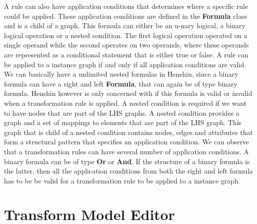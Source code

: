 A rule can also have application conditions that determines where a specific
rule could be applied. These application conditions are defined in the
\textbf{Formula} class and is a child of a graph. This formula can either be an
u-nary logical, a binary logical operation or a nested condition. The first
logical operation operated on a single operand while the second operates on two
operands, where these operands are represented as a conditional statement that
is either true or false. A rule can be applied to a instance graph if and only
if all application conditions are valid. We can basically have a unlimited
nested formulas in Henshin, since a binary formula can have a right and left
\textbf{Formula}, that can again be of type binary formula. Henshin however is
only concerned with if this formula is valid or invalid when a transformation
rule is applied. A nested condition is required if we want to have nodes that
are part of the LHS graphs. A nested condition provides a graph and a set of
mappings to elements that are part of the LHS graph. This graph that is child of
a nested condition contains nodes, edges and attributes that form a structural
pattern that specifies an application condition. We can observe that a
transformation rules can have several number of application conditions. A
binary formula can be of type \textbf{Or} or \textbf{And}. If the structure of a
binary formula is the latter, then all the application conditions from both the
right and left formula has to be be valid for a transformation rule to be
applied to a instance graph. 

\section{Transform Model Editor}

